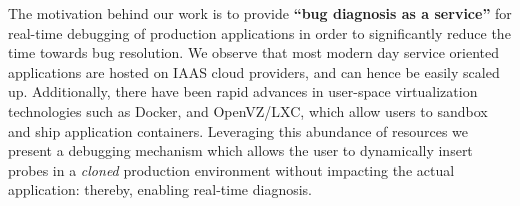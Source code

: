 
The motivation behind our work is to provide \textbf{``bug diagnosis as a service''} for real-time debugging of production applications in order to significantly reduce the time towards bug resolution.
We observe that most modern day service oriented applications are hosted on IAAS cloud providers, and can hence be easily scaled  up. 
Additionally, there have been rapid advances in user-space virtualization technologies such as Docker\cite{docker}, and OpenVZ/LXC\cite{openvz,lxc}, which allow users to sandbox and ship application containers. 
Leveraging this abundance of resources we present a debugging mechanism which allows the user to dynamically insert probes in a \emph{cloned} production environment without impacting the actual application: thereby, enabling real-time diagnosis.

